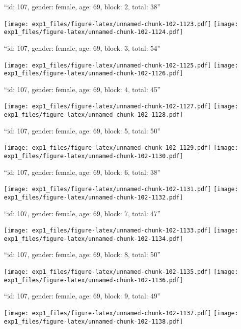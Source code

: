 \documentclass[11pt,,]{article}
\begin{document}
\newpage
[1] 

``id: 107, gender: female, age: 69, block: 2, total: 38''

\texttt{[image: exp1\_files/figure-latex/unnamed-chunk-102-1123.pdf]}
\texttt{[image: exp1\_files/figure-latex/unnamed-chunk-102-1124.pdf]}

\newpage
[1] 

``id: 107, gender: female, age: 69, block: 3, total: 54''

\texttt{[image: exp1\_files/figure-latex/unnamed-chunk-102-1125.pdf]}
\texttt{[image: exp1\_files/figure-latex/unnamed-chunk-102-1126.pdf]}

\newpage
[1] 

``id: 107, gender: female, age: 69, block: 4, total: 45''

\texttt{[image: exp1\_files/figure-latex/unnamed-chunk-102-1127.pdf]}
\texttt{[image: exp1\_files/figure-latex/unnamed-chunk-102-1128.pdf]}

\newpage
[1] 

``id: 107, gender: female, age: 69, block: 5, total: 50''

\texttt{[image: exp1\_files/figure-latex/unnamed-chunk-102-1129.pdf]}
\texttt{[image: exp1\_files/figure-latex/unnamed-chunk-102-1130.pdf]}

\newpage
[1] 

``id: 107, gender: female, age: 69, block: 6, total: 38''

\texttt{[image: exp1\_files/figure-latex/unnamed-chunk-102-1131.pdf]}
\texttt{[image: exp1\_files/figure-latex/unnamed-chunk-102-1132.pdf]}

\newpage
[1] 

``id: 107, gender: female, age: 69, block: 7, total: 47''

\texttt{[image: exp1\_files/figure-latex/unnamed-chunk-102-1133.pdf]}
\texttt{[image: exp1\_files/figure-latex/unnamed-chunk-102-1134.pdf]}

\newpage
[1] 

``id: 107, gender: female, age: 69, block: 8, total: 50''

\texttt{[image: exp1\_files/figure-latex/unnamed-chunk-102-1135.pdf]}
\texttt{[image: exp1\_files/figure-latex/unnamed-chunk-102-1136.pdf]}

\newpage
[1] 

``id: 107, gender: female, age: 69, block: 9, total: 49''

\texttt{[image: exp1\_files/figure-latex/unnamed-chunk-102-1137.pdf]}
\texttt{[image: exp1\_files/figure-latex/unnamed-chunk-102-1138.pdf]}
\end{document}
